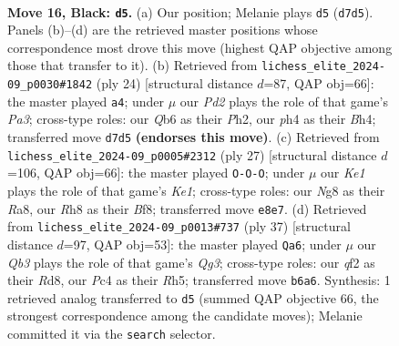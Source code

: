 \documentclass[11pt]{article}
\begin{document}
\clearpage

\begin{figure}[p]\centering
\begin{subfigure}{0.46\textwidth}\centering
\resizebox{\linewidth}{!}{%
\newchessgame
\chessboard[
  setfen={2r1kbnr/pb1p1pp1/1q6/2p1P1Pp/2p2P1P/2P4R/PP3Q2/RNB1K2B b Qk - 3 16},
  showmover=false,
  pgfstyle=straightmove, color=movearrow, markmove={d7-d5}
]}
\caption{}
\end{subfigure}\hfill
\begin{subfigure}{0.46\textwidth}\centering
\resizebox{\linewidth}{!}{%
\newchessgame
\chessboard[
  setfen={rn3r1k/p1pq1ppp/bp2p3/3pP3/3P2QB/P1P5/2P2PPP/R3KB1R w KQ - 1 13},
  showmover=false,
  pgfstyle=straightmove, color=movearrow, markmove={a3-a4}
]}
\caption{}
\end{subfigure}
\\[4pt]
\begin{subfigure}{0.46\textwidth}\centering
\resizebox{\linewidth}{!}{%
\newchessgame
\chessboard[
  setfen={r3kb1r/p2np1p1/1qp3p1/2p3Pp/2Pp3P/1P2P3/PBQP1P2/RN2K2R b KQkq - 1 14},
  showmover=false,
  pgfstyle=straightmove, color=movearrow, markmove={e8-c8}
]}
\caption{}
\end{subfigure}\hfill
\begin{subfigure}{0.46\textwidth}\centering
\resizebox{\linewidth}{!}{%
\newchessgame
\chessboard[
  setfen={3rkb2/pp3pp1/6q1/P1p2b1r/4pP1p/1PB1P2P/3PN1P1/R2Q1K1R b - - 1 19},
  showmover=false,
  pgfstyle=straightmove, color=movearrow, markmove={g6-a6}
]}
\caption{}
\end{subfigure}
\caption{\textbf{Move 16, Black: \texttt{d5}.} (a) Our position; Melanie plays \texttt{d5} (\texttt{d7d5}). Panels (b)--(d) are the retrieved master positions whose correspondence most drove this move (highest QAP objective among those that transfer to it). (b) Retrieved from \texttt{lichess\_elite\_2024-09\_p0030\#1842} (ply 24) [structural distance $d$=87, QAP obj=66]: the master played \texttt{a4}; under $\mu$ our \emph{Pd2} plays the role of that game's \emph{Pa3}; cross-type roles: our \emph{Q}b6 as their \emph{P}h2, our \emph{p}h4 as their \emph{B}h4; transferred move \texttt{d7d5} \textbf{(endorses this move)}. (c) Retrieved from \texttt{lichess\_elite\_2024-09\_p0005\#2312} (ply 27) [structural distance $d$=106, QAP obj=66]: the master played \texttt{O-O-O}; under $\mu$ our \emph{Ke1} plays the role of that game's \emph{Ke1}; cross-type roles: our \emph{N}g8 as their \emph{R}a8, our \emph{R}h8 as their \emph{B}f8; transferred move \texttt{e8e7}. (d) Retrieved from \texttt{lichess\_elite\_2024-09\_p0013\#737} (ply 37) [structural distance $d$=97, QAP obj=53]: the master played \texttt{Qa6}; under $\mu$ our \emph{Qb3} plays the role of that game's \emph{Qg3}; cross-type roles: our \emph{q}f2 as their \emph{R}d8, our \emph{P}c4 as their \emph{R}h5; transferred move \texttt{b6a6}. Synthesis: 1 retrieved analog transferred to \texttt{d5} (summed QAP objective 66, the strongest correspondence among the candidate moves); Melanie committed it via the \texttt{search} selector.}
\label{fig:thought-m31}
\end{figure}
\end{document}
